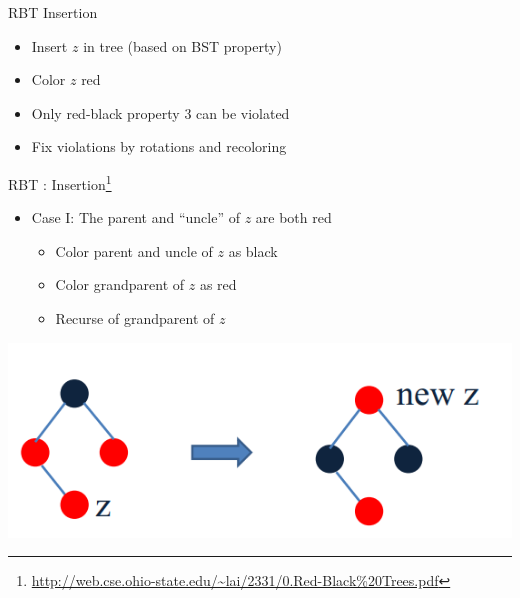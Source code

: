 \documentclass{beamer}
\begin{document}
\begin{frame}{RBT Insertion }
    \begin{itemize}
        \item Insert $z$ in tree (based on BST property)
        \item Color $z$ red
        \item Only red-black property $3$ can be violated
        \item Fix violations by rotations and recoloring
    \end{itemize}
\end{frame}

\begin{frame}{RBT : Insertion\footnote{\url{http://web.cse.ohio-state.edu/~lai/2331/0.Red-Black\%20Trees.pdf}}}
    \begin{itemize}
        \item Case I: The parent and ``uncle'' of $z$ are both red
        \begin{itemize}
            \item Color parent and uncle of $z$ as black
            \item Color grandparent of $z$ as red
            \item Recurse of grandparent of $z$
        \end{itemize}
    \end{itemize}
    \begin{center}
        \includegraphics[scale=0.4]{rbtInsertEg1.png}
    \end{center}
\end{frame}
\end{document}
